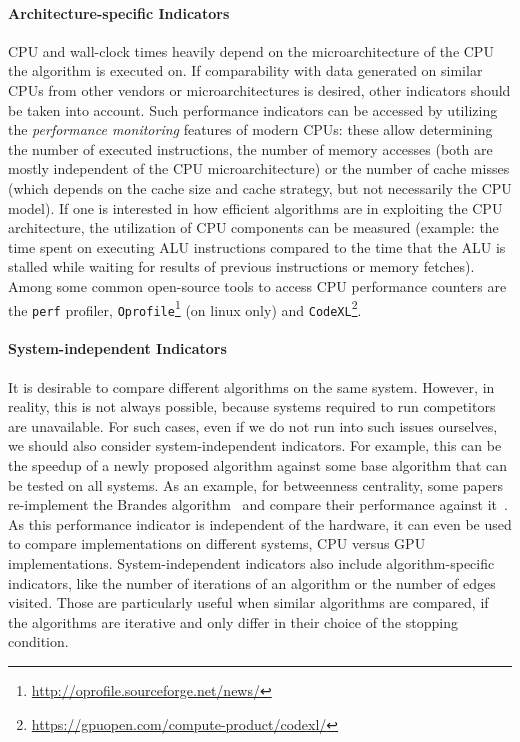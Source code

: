 \documentclass[algorithms,article,submit,moreauthors,pdftex]{Definitions/mdpi}
\newcommand{\changed}[1]{#1}
\begin{document}
\paragraph*{Architecture-specific \changed{Indicators}}
%
CPU and wall-clock times heavily depend on the microarchitecture of the CPU
the algorithm is executed on. If comparability with data generated on similar CPUs
from other vendors or microarchitectures is desired, other \changed{indicators} should be
taken into account. Such \changed{performance indicators} can be accessed by utilizing the
\emph{performance monitoring} features of modern CPUs: these allow determining
the number of executed instructions, the number of memory accesses
(both are mostly independent of the CPU microarchitecture)
or the number of cache misses (which depends on the cache size and cache strategy, but not necessarily the CPU model).
If one is interested in how efficient algorithms are in
exploiting the CPU architecture, the utilization of CPU components can be measured
(example: the time spent on executing ALU instructions compared to the time that the ALU is
stalled while waiting for results of previous instructions or memory fetches).
Among some common open-source tools to access CPU performance counters are the \texttt{perf} profiler,
\texttt{Oprofile}\footnote{\url{http://oprofile.sourceforge.net/news/}}
(on linux only) and \texttt{CodeXL}\footnote{\url{https://gpuopen.com/compute-product/codexl/}}. 

\paragraph*{System-independent Indicators}
%
It is desirable to compare different algorithms on the same
system. However, in reality, this is not always possible, \eg because
systems required to run competitors are unavailable. For such cases,
even if we do not run into such issues ourselves, we should also consider
system-independent \changed{indicators}. For example, this can be the speedup of a newly proposed algorithm against some
base  algorithm that can be tested on all systems.
As an example, for betweenness centrality, some papers re-implement the Brandes
algorithm~\cite{brandes2001faster} and compare their performance against
it~\cite{riondato2018abra, bergamini15, crescenzi15}.
As this \changed{performance indicator} is independent of the hardware,
it can even be used to compare implementations on different systems, \eg CPU versus GPU implementations.
System-independent \changed{indicators} also include algorithm-specific \changed{indicators},
like the number of iterations of an algorithm or the number of edges visited.
Those are particularly useful when similar algorithms are compared,
\eg if the algorithms are iterative and only differ in their choice of the stopping condition.
\end{document}
